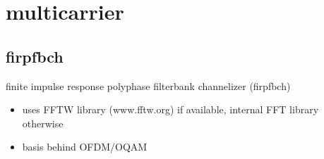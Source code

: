 \section{multicarrier}

\subsection{firpfbch}
finite impulse response polyphase filterbank channelizer (firpfbch)
\begin{itemize}
\item uses FFTW library (www.fftw.org) if available, internal FFT library
      otherwise
\item basis behind OFDM/OQAM
\end{itemize}


